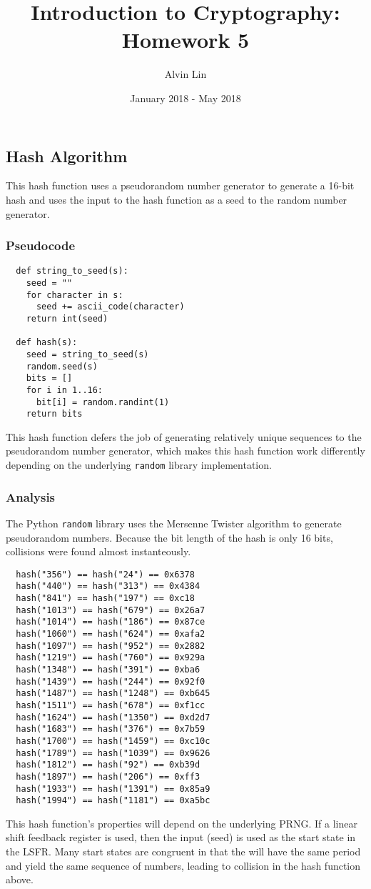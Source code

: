 \documentclass{math}
\title{Introduction to Cryptography: Homework 5}
\author{Alvin Lin}
\date{January 2018 - May 2018}
\begin{document}
\maketitle

\subsection*{Hash Algorithm}
This hash function uses a pseudorandom number generator to generate a 16-bit
hash and uses the input to the hash function as a seed to the random number
generator.

\subsubsection*{Pseudocode}
\begin{lstlisting}
  def string_to_seed(s):
    seed = ""
    for character in s:
      seed += ascii_code(character)
    return int(seed)

  def hash(s):
    seed = string_to_seed(s)
    random.seed(s)
    bits = []
    for i in 1..16:
      bit[i] = random.randint(1)
    return bits
\end{lstlisting}
This hash function defers the job of generating relatively unique sequences to
the pseudorandom number generator, which makes this hash function work
differently depending on the underlying \texttt{random} library implementation.
\\

\subsubsection*{Analysis}
The Python \texttt{random} library uses the Mersenne Twister algorithm to
generate pseudorandom numbers. Because the bit length of the hash is only 16
bits, collisions were found almost instanteously.
\begin{lstlisting}
  hash("356") == hash("24") == 0x6378
  hash("440") == hash("313") == 0x4384
  hash("841") == hash("197") == 0xc18
  hash("1013") == hash("679") == 0x26a7
  hash("1014") == hash("186") == 0x87ce
  hash("1060") == hash("624") == 0xafa2
  hash("1097") == hash("952") == 0x2882
  hash("1219") == hash("760") == 0x929a
  hash("1348") == hash("391") == 0xba6
  hash("1439") == hash("244") == 0x92f0
  hash("1487") == hash("1248") == 0xb645
  hash("1511") == hash("678") == 0xf1cc
  hash("1624") == hash("1350") == 0xd2d7
  hash("1683") == hash("376") == 0x7b59
  hash("1700") == hash("1459") == 0xc10c
  hash("1789") == hash("1039") == 0x9626
  hash("1812") == hash("92") == 0xb39d
  hash("1897") == hash("206") == 0xff3
  hash("1933") == hash("1391") == 0x85a9
  hash("1994") == hash("1181") == 0xa5bc
\end{lstlisting}
This hash function's properties will depend on the underlying PRNG. If a linear
shift feedback register is used, then the input (seed) is used as the start
state in the LSFR. Many start states are congruent in that the will have the
same period and yield the same sequence of numbers, leading to collision in the
hash function above.
\end{document}
